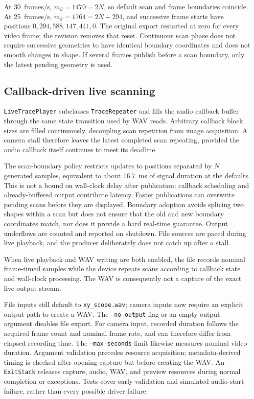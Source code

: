 \documentclass[11pt,a4paper]{article}
\newcommand{\code}[1]{\texttt{#1}}
\begin{document}
At 30~frames/s, $m_k=1470=2N$, so default scan and frame boundaries coincide. At 25~frames/s, $m_k=1764=2N+294$, and successive frame starts have positions $0,294,588,147,441,0$. The original export restarted at zero for every video frame; the revision removes that reset. Continuous scan phase does not require successive geometries to have identical boundary coordinates and does not smooth changes in shape. If several frames publish before a scan boundary, only the latest pending geometry is used.

\subsection{Callback-driven live scanning}
\code{LiveTracePlayer} subclasses \code{TraceRepeater} and fills the audio callback buffer through the same state transition used by WAV reads. Arbitrary callback block sizes are filled continuously, decoupling scan repetition from image acquisition. A camera stall therefore leaves the latest completed scan repeating, provided the audio callback itself continues to meet its deadline.

The scan-boundary policy restricts updates to positions separated by $N$ generated samples, equivalent to about 16.7~ms of signal duration at the defaults. This is not a bound on wall-clock delay after publication: callback scheduling and already-buffered output contribute latency. Faster publications can overwrite pending scans before they are displayed. Boundary adoption avoids splicing two shapes within a scan but does not ensure that the old and new boundary coordinates match, nor does it provide a hard real-time guarantee. Output underflows are counted and reported on shutdown. File sources are paced during live playback, and the producer deliberately does not catch up after a stall.

When live playback and WAV writing are both enabled, the file records nominal frame-timed samples while the device repeats scans according to callback state and wall-clock processing. The WAV is consequently not a capture of the exact live output stream.

File inputs still default to \code{xy\_scope.wav}; camera inputs now require an explicit output path to create a WAV. The \code{--no-output} flag or an empty output argument disables file export. For camera input, recorded duration follows the acquired frame count and nominal frame rate, and can therefore differ from elapsed recording time. The \code{--max-seconds} limit likewise measures nominal video duration. Argument validation precedes resource acquisition; metadata-derived timing is checked after opening capture but before creating the WAV. An \code{ExitStack} releases capture, audio, WAV, and preview resources during normal completion or exceptions. Tests cover early validation and simulated audio-start failure, rather than every possible driver failure.
\end{document}
